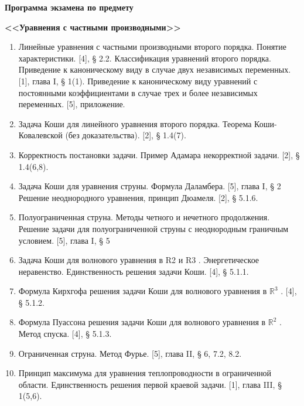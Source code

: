 \begin{center}
	{\Large \textbf{Программа экзамена по предмету}}
	
	{\Large \textbf{<<Уравнения с частными производными>>}}
\end{center}

\begin{enumerate}
\item Линейные уравнения с частными производными второго порядка. Понятие характеристики. [4], § 2.2. Классификация
уравнений второго порядка. Приведение к каноническому виду в случае двух независимых переменных. [1], глава I, §
1(1). Приведение к каноническому виду уравнений с постоянными коэффициентами в случае трех и более независимых
переменных. [5], приложение.

\item Задача Коши для линейного уравнения второго порядка. Теорема Коши-Ковалевской (без доказательства). [2], § 1.4(7).

\item Корректность постановки задачи. Пример Адамара некорректной задачи. [2], § 1.4(6,8).

\item Задача Коши для уравнения струны. Формула Даламбера. [5], глава I, § 2 Решение неоднородного уравнения, принцип
Дюамеля. [2], § 5.1.6.

\item Полуограниченная струна. Методы четного и нечетного продолжения. Решение задачи для полуограниченной струны с
неоднородным граничным условием. [5], глава I, § 5

\item Задача Коши для волнового уравнения в R2 и R3 . Энергетическое неравенство. Единственность решения задачи
Коши. [4], § 5.1.1.

\item Формула Кирхгофа решения задачи Коши для волнового уравнения в $ \mathbb{R}^3 $ . [4], § 5.1.2.

\item Формула Пуассона решения задачи Коши для волнового уравнения в $ \mathbb{R}^2 $ . Метод спуска. [4], § 5.1.3.

\item Ограниченная струна. Метод Фурье. [5], глава II, § 6, 7.2, 8.2.

\item Принцип максимума для уравнения теплопроводности в ограниченной области. Единственность решения первой
краевой задачи. [1], глава III, § 1(5,6).


\end{enumerate}
